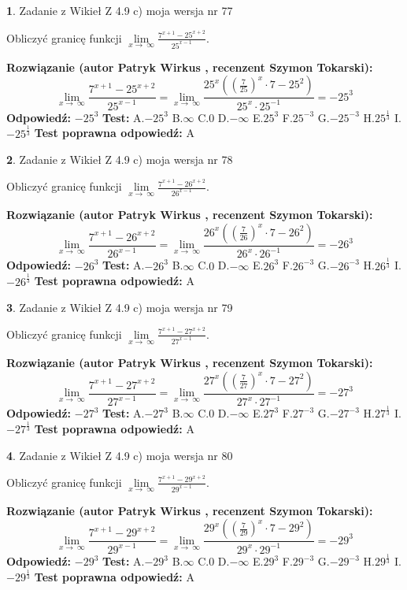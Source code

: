 \documentclass[12pt, a4paper]{article}
\theoremstyle{definition} %
\newtheorem{zad}{}
\newcommand{\zadStart}[1]{\begin{zad}#1\newline}
\newcommand{\zadStop}{\end{zad}}
\newcommand{\rozwStart}[2]{\noindent \textbf{Rozwiązanie (autor #1 , recenzent #2): }\newline}
\newcommand{\rozwStop}{\newline}
\newcommand{\odpStart}{\noindent \textbf{Odpowiedź:}\newline}
\newcommand{\odpStop}{\newline}
\newcommand{\testStart}{\noindent \textbf{Test:}\newline}
\newcommand{\testStop}{\newline}
\newcommand{\kluczStart}{\noindent \textbf{Test poprawna odpowiedź:}\newline}
\newcommand{\kluczStop}{\newline}
\begin{document}
\zadStart{Zadanie z Wikieł Z 4.9 c) moja wersja nr 77}


Obliczyć granicę funkcji  $\lim\limits_{x\to\ \infty}\frac{7^{x+1}-25^{x+2}}{25^{x-1}}$.
\zadStop
\rozwStart{Patryk Wirkus}{Szymon Tokarski}
$$\lim\limits_{x\to\ \infty}\frac{7^{x+1}-25^{x+2}}{25^{x-1}}=\lim\limits_{x\to\ \infty}\frac{25^{x}((\frac{7}{25})^{x}\cdot 7 -25^{2})}{25^{x}\cdot 25^{-1}} = -25^{3}$$
\rozwStop
\odpStart
$-25^{3}$
\odpStop
\testStart
A.$-25^{3}$ B.$\infty$ C.$0$ D.$-\infty$ E.$25^{3}$
F.$25^{-3}$ G.$-25^{-3}$
H.$25^{\frac{1}{3}}$
I.$-25^{\frac{1}{3}}$
\testStop
\kluczStart
A
\kluczStop



\zadStart{Zadanie z Wikieł Z 4.9 c) moja wersja nr 78}


Obliczyć granicę funkcji  $\lim\limits_{x\to\ \infty}\frac{7^{x+1}-26^{x+2}}{26^{x-1}}$.
\zadStop
\rozwStart{Patryk Wirkus}{Szymon Tokarski}
$$\lim\limits_{x\to\ \infty}\frac{7^{x+1}-26^{x+2}}{26^{x-1}}=\lim\limits_{x\to\ \infty}\frac{26^{x}((\frac{7}{26})^{x}\cdot 7 -26^{2})}{26^{x}\cdot 26^{-1}} = -26^{3}$$
\rozwStop
\odpStart
$-26^{3}$
\odpStop
\testStart
A.$-26^{3}$ B.$\infty$ C.$0$ D.$-\infty$ E.$26^{3}$
F.$26^{-3}$ G.$-26^{-3}$
H.$26^{\frac{1}{3}}$
I.$-26^{\frac{1}{3}}$
\testStop
\kluczStart
A
\kluczStop



\zadStart{Zadanie z Wikieł Z 4.9 c) moja wersja nr 79}


Obliczyć granicę funkcji  $\lim\limits_{x\to\ \infty}\frac{7^{x+1}-27^{x+2}}{27^{x-1}}$.
\zadStop
\rozwStart{Patryk Wirkus}{Szymon Tokarski}
$$\lim\limits_{x\to\ \infty}\frac{7^{x+1}-27^{x+2}}{27^{x-1}}=\lim\limits_{x\to\ \infty}\frac{27^{x}((\frac{7}{27})^{x}\cdot 7 -27^{2})}{27^{x}\cdot 27^{-1}} = -27^{3}$$
\rozwStop
\odpStart
$-27^{3}$
\odpStop
\testStart
A.$-27^{3}$ B.$\infty$ C.$0$ D.$-\infty$ E.$27^{3}$
F.$27^{-3}$ G.$-27^{-3}$
H.$27^{\frac{1}{3}}$
I.$-27^{\frac{1}{3}}$
\testStop
\kluczStart
A
\kluczStop



\zadStart{Zadanie z Wikieł Z 4.9 c) moja wersja nr 80}


Obliczyć granicę funkcji  $\lim\limits_{x\to\ \infty}\frac{7^{x+1}-29^{x+2}}{29^{x-1}}$.
\zadStop
\rozwStart{Patryk Wirkus}{Szymon Tokarski}
$$\lim\limits_{x\to\ \infty}\frac{7^{x+1}-29^{x+2}}{29^{x-1}}=\lim\limits_{x\to\ \infty}\frac{29^{x}((\frac{7}{29})^{x}\cdot 7 -29^{2})}{29^{x}\cdot 29^{-1}} = -29^{3}$$
\rozwStop
\odpStart
$-29^{3}$
\odpStop
\testStart
A.$-29^{3}$ B.$\infty$ C.$0$ D.$-\infty$ E.$29^{3}$
F.$29^{-3}$ G.$-29^{-3}$
H.$29^{\frac{1}{3}}$
I.$-29^{\frac{1}{3}}$
\testStop
\kluczStart
A
\kluczStop
\end{document}

